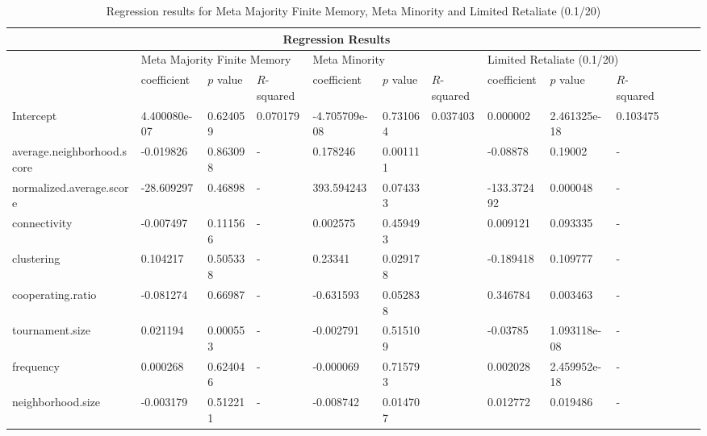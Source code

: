 \begin{table}[!hbtp]
	\centering
	\begin{adjustbox}{width=0.9\textwidth}
		\small
		\begin{tabular}{|l|l|l|l|l|l|l|l|l|l|l|l|l|}
			\hline
			\multicolumn{10}{|c|}{Regression Results}                                                                       \\ \hline
			& \multicolumn{3}{l|}{Meta Majority Finite Memory} & \multicolumn{3}{l|}{Meta Minority} & \multicolumn{3}{l|}{Limited Retaliate (0.1/20)}\\ \hline
			                           & coefficient  & \(p\) value & \(R\)-squared & coefficient   & \(p\) value & \(R\)-squared & coefficient & \(p\) value  & \(R\)-squared \\ \hline
			Intercept                  & 4.400080e-07 & 0.624059    & 0.070179      & -4.705709e-08 & 0.731064    & 0.037403      & 0.000002    & 2.461325e-18 & 0.103475      \\ \hline
			average.neighborhood.score & -0.019826    & 0.863098    & -             & 0.178246      & 0.001111    &               & -0.08878    & 0.19002      & -             \\ \hline
			normalized.average.score   & -28.609297   & 0.46898     & -             & 393.594243    & 0.074333    &               & -133.372492 & 0.000048     & -             \\ \hline
			connectivity               & -0.007497    & 0.111566    & -             & 0.002575      & 0.459493    &               & 0.009121    & 0.093335     & -             \\ \hline
			clustering                 & 0.104217     & 0.505338    & -             & 0.23341       & 0.029178    &               & -0.189418   & 0.109777     & -             \\ \hline
			cooperating.ratio          & -0.081274    & 0.66987     & -             & -0.631593     & 0.052838    &               & 0.346784    & 0.003463     & -             \\ \hline
			tournament.size            & 0.021194     & 0.000553    & -             & -0.002791     & 0.515109    &               & -0.03785    & 1.093118e-08 & -             \\ \hline
			frequency                  & 0.000268     & 0.624046    & -             & -0.000069     & 0.715793    &               & 0.002028    & 2.459952e-18 & -             \\ \hline
			neighborhood.size          & -0.003179    & 0.512211    & -             & -0.008742     & 0.014707    &               & 0.012772    & 0.019486     & -             \\ \hline
		\end{tabular}
	\end{adjustbox}
	\caption{Regression results for ​Meta Majority Finite Memory, Meta Minority and Limited Retaliate (0.1/20)}
	\label{reg-for-bot}
\end{table}


